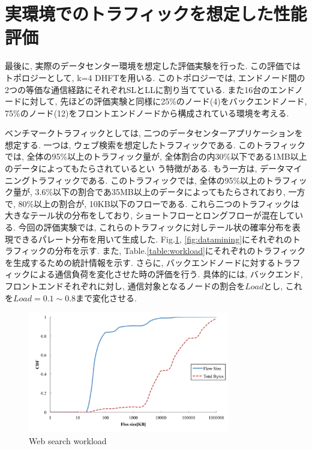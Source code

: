 \section{実環境でのトラフィックを想定した性能評価}
\label{sec:real_traffic}
最後に, 実際のデータセンター環境を想定した評価実験を行った. 
この評価ではトポロジーとして, k=4 DHFTを用いる. 
このトポロジーでは, エンドノード間の2つの等価な通信経路にそれぞれSLとLLに割り当てている.
また16台のエンドノードに対して, 先ほどの評価実験と同様に25\%のノード(4)をバックエンドノード,
75\%のノード(12)をフロントエンドノードから構成されている環境を考える. 

ベンチマークトラフィックとしては, 二つのデータセンターアプリケーションを想定する. 
一つは, ウェブ検索を想定したトラフィック\cite{dctcp}である. 
このトラフィックでは, 全体の95\%以上のトラフィック量が, 全体割合の内30\%以下である1MB以上のデータによってもたらされているとい
う特徴がある. 
もう一方は, データマイニングトラフィックである\cite{vl2}. 
このトラフィックでは, 全体の95\%以上のトラフィック量が, 3.6\%以下の割合であ35MB以上のデータによってもたらされており, 一方で,
80\%以上の割合が, 10KB以下のフローである. 
これら二つのトラフィックは大きなテール状の分布をしており, ショートフローとロングフローが混在している. 
今回の評価実験では, これらのトラフィックに対しテール状の確率分布を表現できるパレート分布を用いて生成した.  
Fig.\ref{fig:websearch}, \ref{fig:datamining}にそれぞれのトラフィックの分布を示す. 
また, Table.\ref{table:workload}にそれぞれのトラフィックを生成するための統計情報を示す. 
さらに, バックエンドノードに対するトラフィックによる通信負荷を変化させた時の評価を行う. 
具体的には, バックエンド, フロントエンドそれぞれに対し, 通信対象となるノードの割合を$Load$とし, これを$Load=0.1 \sim
0.8$まで変化させる. 

\begin{figure}[t]
    \begin{center}
    \includegraphics[autoebb, width=250pt]{./img/websearch.pdf}
    \caption{Web search workload}
    \label{fig:websearch}
    \end{center}
\end{figure}

